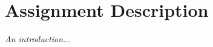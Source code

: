 \chapter{Assignment Description}
\label{chapter:introduction}

\emph{An introduction... \cite{example-article}}
